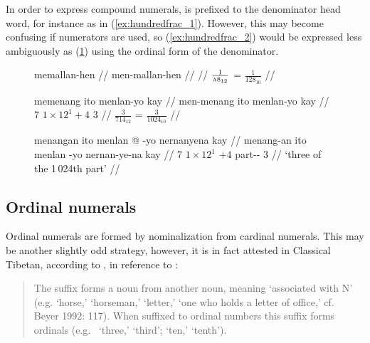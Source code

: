 In order to express compound numerals,  is prefixed to the
denominator head word, for instance as in (\ref{ex:hundredfrac_1}). However,
this may become confusing if numerators are used, so (\ref{ex:hundredfrac_2})
would be expressed less ambiguously as (\ref{ex:hundredfrac_3}) using the
ordinal form of the denominator.

\begin{figure}[h]
\pex
\a\label{ex:hundredfrac_1}\begingl
	\gla memallan-hen //
	\glb men-mallan-hen //
	 //
	\glft $\frac{1}{\textsc{a}8_{12}}$ = $\frac{1}{128_{10}}$ //
\endgl

\a\label{ex:hundredfrac_2}\ljudge\ques\begingl
	\gla memenang ito menlan-yo kay //
	\glb men-menang ito menlan-yo kay //
	 {$7$} {$1 \times 12^1 + 4$} {$3$} //
	\glft $\frac{3}{714_{12}}$ = $\frac{3}{1024_{10}}$ //
\endgl

\a\label{ex:hundredfrac_3}\begingl
	\gla menangan ito menlan @ -yo nernanyena kay //
	\glb menang-an ito menlan -yo nernan-ye-na kay //
	 {$7$} {$1 \times 12^1$} {$+4$} part-\Pl{}-\Gen{} 
		$3$ //
	\glft `three of the 1\,024th part' //
\endgl
\xe
\end{figure}



\subsection{Ordinal numerals}

Ordinal numerals are formed by nominalization from cardinal numerals. This may 
be another slightly odd strategy, however, it is in fact attested in Classical 
Tibetan, according to \citet{chungetal2014}, in reference to \citet{beyer1992}:

\blockcquote[626]{chungetal2014}{The suffix  forms a noun from another 
noun, meaning `associated with N' (e.g.  `horse,'  
`horseman,'  `letter,'  `one who holds a letter of 
office,' cf.\ \nocite{beyer1992} Beyer 1992: 117). When suffixed to ordinal 
numbers this suffix forms ordinals (e.g.\  `three,'  
`third';  `ten,'  `tenth').}

